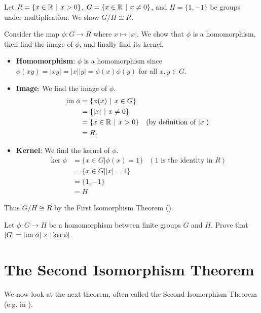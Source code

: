 \begin{example}
    Let $R = \{x \in \R \vert x > 0\}$, $G = \{x \in \R \vert x \neq 0\}$, and $H = \{1, -1\}$ be groups under multiplication. We show $G / H \cong R$.

    Consider the map $\phi: G \to R$ where $x \mapsto |x|$. We show that $\phi$ is a homomorphism, then find the image of $\phi$, and finally find its kernel.

    \begin{itemize}
        \item \textbf{Homomorphism}: $\phi$ is a homomorphism since $\phi(xy) = |xy| = |x||y| = \phi(x)\phi(y)$ for all $x, y \in G$.

        \item \textbf{Image}: We find the image of $\phi$.
        \begin{align*}
            \im\phi &= \{\phi(x) \vert x \in G\}\\
            &= \{|x| \vert x \neq 0\}\\
            &= \{x \in \R \vert x > 0\} & (\text{by definition of } |x|)\\
            &= R.
        \end{align*}

        \item \textbf{Kernel}: We find the kernel of $\phi$.
        \begin{align*}
            \ker\phi &= \{x \in G \vert \phi(x) = 1\} & (1 \text{ is the identity in } R)\\
            &= \{x \in G \vert |x| = 1\}\\
            &= \{1, -1\}\\
            &= H
        \end{align*}
    \end{itemize}
    Thus $G/H \cong R$ by the First Isomorphism Theorem ().
\end{example}

\begin{exercise}
    Let $\phi: G \to H$ be a homomorphism between finite groups $G$ and $H$. Prove that $|G| = |\mathrm{im}\; \phi|\times|\ker \phi|$.
\end{exercise}

\section{The Second Isomorphism Theorem}
We now look at the next theorem, often called the Second Isomorphism Theorem (e.g. in {\cite[\S 69]{clark_1984}}).

